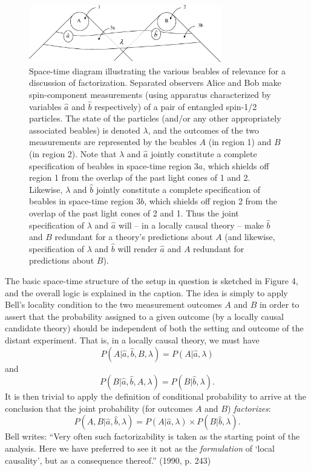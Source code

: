 \documentclass[aps,prc,twocolumn]{revtex4}
\begin{document}
\begin{figure}[t]
\begin{center}
\includegraphics[width=3.3in,clip]{./fig5.eps}
\end{center}
\caption{
\label{fig5}
Space-time diagram illustrating the various beables of  relevance for
a discussion of factorization.  Separated observers Alice and Bob make
spin-component measurements (using apparatus characterized by
variables $\hat{a}$ and  $\hat{b}$
respectively) of a pair of entangled spin-1/2 particles.   The state
of the particles (and/or any other appropriately associated beables) is denoted
$\lambda$, and the outcomes of the two measurements are represented by
the beables $A$ (in region 1) and $B$ (in region 2).  Note that
$\lambda$ and $\hat{a}$ jointly constitute a complete
specification of beables in space-time region $3a$, which shields off
region 1 from the overlap of the past light cones of 1 and 2.
Likewise, $\lambda$ and $\hat{b}$ jointly constitute a complete
specification of beables in space-time region $3b$, which shields off
region 2 from the overlap of the past light cones of 2 and 1.   Thus
the joint specification of $\lambda$ and $\hat{a}$ will -- in a
locally causal theory -- make $\hat{b}$ and $B$ redundant for a 
theory's predictions about $A$ (and likewise, specification of
$\lambda$ and $\hat{b}$ will render $\hat{a}$ and $A$ redundant
for predictions about $B$).
}
\end{figure}


The basic space-time structure of the setup in question is sketched in
Figure 4, and the overall logic is explained in the caption.  The idea 
is simply to apply Bell's locality condition to the two measurement
outcomes $A$ and $B$ in order to assert that the probability assigned
to a given outcome (by a locally causal candidate theory) should be
independent of both the setting and outcome of the distant
experiment.  That is, in a locally causal theory, we must have
\begin{equation}
P(A | \hat{a}, \hat{b}, B, \lambda) = P(A | \hat{a}, \lambda)
\label{eq:BLA}
\end{equation}
and
\begin{equation}
P(B | \hat{a}, \hat{b}, A, \lambda) = P(B | \hat{b}, \lambda). 
\label{eq:BLB}
\end{equation}
It is then trivial to apply the definition of conditional probability
to arrive at the conclusion that the joint probability (for outcomes
$A$ and $B$) \emph{factorizes}:
\begin{equation}
P(A,B | \hat{a},\hat{b}, \lambda) = P(A|\hat{a},\lambda) \times
P(B|\hat{b},\lambda).
\label{eq:factor}
\end{equation}
Bell writes:  ``Very often such
factorizability is taken as the starting point of the analysis.  Here
we have preferred to see it not as the \emph{formulation} of `local
causality', but as a consequence thereof.'' (1990, p. 243)
\end{document}
